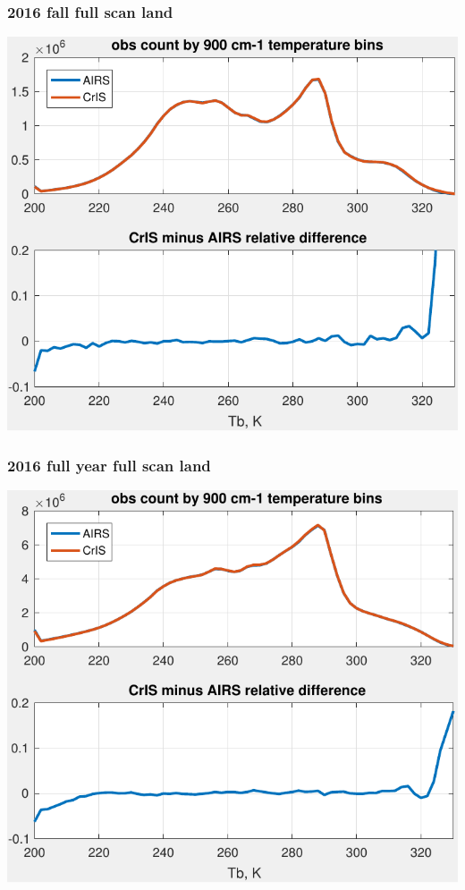 \documentclass[11pt]{beamer}
\begin{document}
\begin{frame}
\frametitle{2016 fall full scan land}
\begin{center}
  \includegraphics[scale=0.7]{figures/full-scan_land_2016_fall.pdf}
\end{center}
\end{frame} %
\begin{frame}
\frametitle{2016 full year full scan land}
\begin{center}
  \includegraphics[scale=0.7]{figures/full-scan_land_2016_all.pdf}
\end{center}
\end{frame} %
\end{document}
